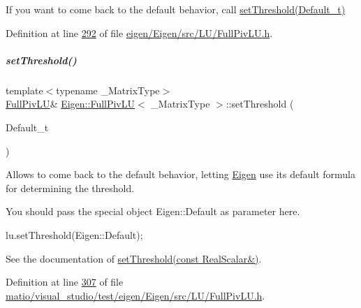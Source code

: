 If you want to come back to the default behavior, call \hyperlink{group___l_u___module_a1b5e30add3dfb6625da1213d68418f44}{set\+Threshold(\+Default\+\_\+t)} 

Definition at line \hyperlink{eigen_2_eigen_2src_2_l_u_2_full_piv_l_u_8h_source_l00292}{292} of file \hyperlink{eigen_2_eigen_2src_2_l_u_2_full_piv_l_u_8h_source}{eigen/\+Eigen/src/\+L\+U/\+Full\+Piv\+L\+U.\+h}.

\mbox{\label{group___l_u___module_a1b5e30add3dfb6625da1213d68418f44}} 
\subparagraph{\texorpdfstring{set\+Threshold()}{setThreshold()}\hspace{0.1cm}{\footnotesize\ttfamily [3/4]}}
{\footnotesize\ttfamily template$<$typename \+\_\+\+Matrix\+Type$>$ \\
\hyperlink{group___l_u___module_class_eigen_1_1_full_piv_l_u}{Full\+Piv\+LU}\& \hyperlink{group___l_u___module_class_eigen_1_1_full_piv_l_u}{Eigen\+::\+Full\+Piv\+LU}$<$ \+\_\+\+Matrix\+Type $>$\+::set\+Threshold (\begin{DoxyParamCaption}\item[{Default\+\_\+t}]{ }\end{DoxyParamCaption})\hspace{0.3cm}{\ttfamily [inline]}}

Allows to come back to the default behavior, letting \hyperlink{namespace_eigen}{Eigen} use its default formula for determining the threshold.

You should pass the special object Eigen\+::\+Default as parameter here. 
\begin{DoxyCode}
lu.setThreshold(Eigen::Default); 
\end{DoxyCode}


See the documentation of \hyperlink{group___l_u___module_a414592d82de98f5bd075965caf56d681}{set\+Threshold(const Real\+Scalar\&)}. 

Definition at line \hyperlink{matio_2visual__studio_2test_2eigen_2_eigen_2src_2_l_u_2_full_piv_l_u_8h_source_l00307}{307} of file \hyperlink{matio_2visual__studio_2test_2eigen_2_eigen_2src_2_l_u_2_full_piv_l_u_8h_source}{matio/visual\+\_\+studio/test/eigen/\+Eigen/src/\+L\+U/\+Full\+Piv\+L\+U.\+h}.

